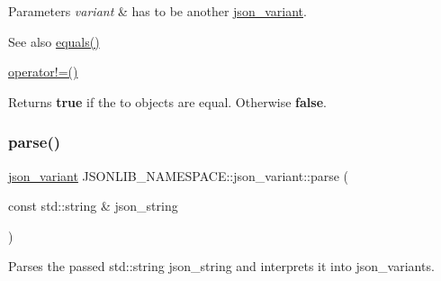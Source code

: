 \begin{DoxyParams}{Parameters}
{\em variant} & has to be another \hyperlink{classJSONLIB__NAMESPACE_1_1json__variant}{json\+\_\+variant}. \\
\hline
\end{DoxyParams}
\begin{DoxySeeAlso}{See also}
\hyperlink{classJSONLIB__NAMESPACE_1_1json__variant_ae68b9cb156c2b2f9e12c7f889634b63a}{equals()} 

\hyperlink{classJSONLIB__NAMESPACE_1_1json__variant_a7672a255983f3142523b3680e737d021}{operator!=()} 
\end{DoxySeeAlso}
\begin{DoxyReturn}{Returns}
{\bfseries true} if the to objects are equal. Otherwise {\bfseries false}. 
\end{DoxyReturn}
\mbox{\label{classJSONLIB__NAMESPACE_1_1json__variant_ae9198f05ef46e3ada2a10d942e8478d0}} 
\subsubsection{\texorpdfstring{parse()}{parse()}\hspace{0.1cm}{\footnotesize\ttfamily [1/2]}}
{\footnotesize\ttfamily \hyperlink{classJSONLIB__NAMESPACE_1_1json__variant}{json\+\_\+variant} J\+S\+O\+N\+L\+I\+B\+\_\+\+N\+A\+M\+E\+S\+P\+A\+C\+E\+::json\+\_\+variant\+::parse (\begin{DoxyParamCaption}\item[{const std\+::string \&}]{json\+\_\+string }\end{DoxyParamCaption})\hspace{0.3cm}{\ttfamily [static]}}



Parses the passed std\+::string {\ttfamily json\+\_\+string} and interprets it into json\+\_\+variants. 


